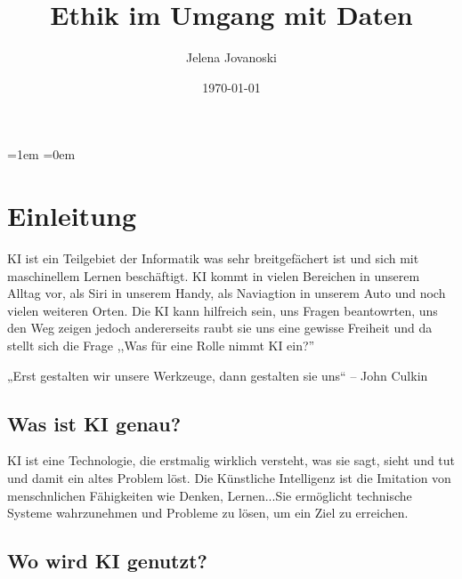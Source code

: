 \documentclass{report}
\title{Ethik im Umgang mit Daten}
\author{Jelena Jovanoski}
\date{\today}
\begin{document}
\maketitle



\tableofcontents
\parskip=1em 
\parindent=0em

\chapter{Einleitung}

KI ist ein Teilgebiet der Informatik was sehr breitgefächert ist und sich mit maschinellem Lernen beschäftigt.
KI kommt in vielen Bereichen in unserem Alltag vor, als Siri in unserem Handy, als Naviagtion in unserem Auto und noch vielen weiteren Orten. 
Die KI kann hilfreich sein, uns Fragen beantowrten, uns den Weg zeigen jedoch andererseits raubt sie uns eine gewisse Freiheit und da stellt sich die Frage ,,Was für eine Rolle nimmt KI ein?''

„Erst gestalten wir unsere Werkzeuge, dann gestalten sie uns“ – John Culkin

\section {Was ist KI genau?}
KI ist eine Technologie, die erstmalig wirklich versteht, was sie sagt, sieht und tut und damit ein altes Problem löst.
Die Künstliche Intelligenz ist die Imitation von menschnlichen Fähigkeiten wie Denken, Lernen...Sie ermöglicht technische Systeme wahrzunehmen und Probleme zu lösen, um ein Ziel zu erreichen.

\section {Wo wird KI genutzt?}
\end{document}
